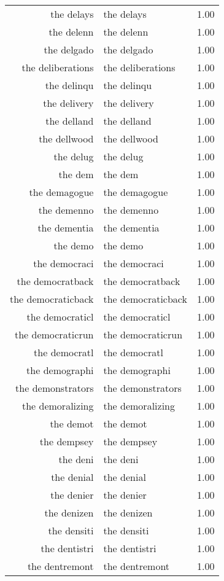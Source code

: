 \begin{table}[ht]
\begin{tabular}{rlr}
  the delays & the delays & 1.00 \\ 
  the delenn & the delenn & 1.00 \\ 
  the delgado & the delgado & 1.00 \\ 
  the deliberations & the deliberations & 1.00 \\ 
  the delinqu & the delinqu & 1.00 \\ 
  the delivery & the delivery & 1.00 \\ 
  the delland & the delland & 1.00 \\ 
  the dellwood & the dellwood & 1.00 \\ 
  the delug & the delug & 1.00 \\ 
  the dem & the dem & 1.00 \\ 
  the demagogue & the demagogue & 1.00 \\ 
  the demenno & the demenno & 1.00 \\ 
  the dementia & the dementia & 1.00 \\ 
  the demo & the demo & 1.00 \\ 
  the democraci & the democraci & 1.00 \\ 
  the democratback & the democratback & 1.00 \\ 
  the democraticback & the democraticback & 1.00 \\ 
  the democraticl & the democraticl & 1.00 \\ 
  the democraticrun & the democraticrun & 1.00 \\ 
  the democratl & the democratl & 1.00 \\ 
  the demographi & the demographi & 1.00 \\ 
  the demonstrators & the demonstrators & 1.00 \\ 
  the demoralizing & the demoralizing & 1.00 \\ 
  the demot & the demot & 1.00 \\ 
  the dempsey & the dempsey & 1.00 \\ 
  the deni & the deni & 1.00 \\ 
  the denial & the denial & 1.00 \\ 
  the denier & the denier & 1.00 \\ 
  the denizen & the denizen & 1.00 \\ 
  the densiti & the densiti & 1.00 \\ 
  the dentistri & the dentistri & 1.00 \\ 
  the dentremont & the dentremont & 1.00 \\ 

\end{tabular}
\end{table}
